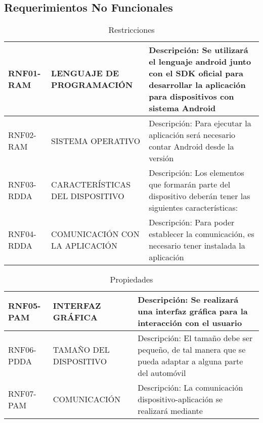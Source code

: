\subsection{Requerimientos No Funcionales} 
  
  \begin{center}
\begin{table}[!htb]
\centering
\begin{tabular}{|p{4cm}|p{4cm}|p{5cm}|}
    \hline
    RNF01-RAM & LENGUAJE DE PROGRAMACIÓN & Descripción: Se utilizará el lenguaje android junto con el SDK oficial para desarrollar la aplicación para dispositivos con sistema Android \\ \hline
    RNF02-RAM & SISTEMA OPERATIVO & Descripción: Para ejecutar la aplicación será necesario contar Android desde la versión \\ \hline
    RNF03-RDDA & CARACTERÍSTICAS DEL DISPOSITIVO & Descripción: Los elementos que formarán parte del dispositivo deberán tener las siguientes características: \\ \hline
    RNF04-RDDA & COMUNICACIÓN CON LA APLICACIÓN & Descripción: Para poder establecer la comunicación, es necesario tener instalada la aplicación \\
    \hline
\end{tabular}
\caption{Restricciones}
\label{tabla:pobconlimsincolo}
\end{table}
\end{center}



\begin{center}
\begin{table}[!htb]
\centering
\begin{tabular}{|p{4cm}|p{4cm}|p{5cm}|}
    \hline
    RNF05-PAM & INTERFAZ GRÁFICA & Descripción: Se realizará una interfaz gráfica para la interacción con el usuario \\ \hline 
    RNF06-PDDA & TAMAÑO DEL DISPOSITIVO & Descripción: El tamaño debe ser pequeño, de tal manera que se pueda adaptar a alguna parte del automóvil \\ \hline
    RNF07-PAM &  COMUNICACIÓN & Descripción: La comunicación dispositivo-aplicación se realizará mediante \\
    \hline
\end{tabular}
\caption{Propiedades}
\label{tabla:pobconlimsincolo}
\end{table}
\end{center}
